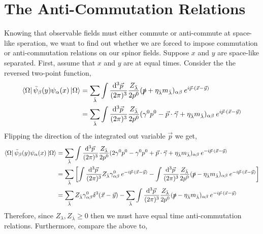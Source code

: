 \documentclass[12pt]{article}
\begin{document}
\section{The Anti-Commutation Relations}
Knowing that observable fields must either commute or anti-commute at space-like speration, we want to find out whether we are forced to impose commutation or anti-commutation relations on our spinor fields. Suppose $x$ and $y$ are space-like separated. First, assume that $x$ and $y$ are at equal times. Consider the the reversed two-point function,
\begin{align*}
\left< \Omega \right| \bar{\psi}_{\beta}(y) \psi_{\alpha}(x) \left| \Omega \right> & = \sum_{\bar{\lambda}} \int \frac{\mathrm{d}^{3} \vec{p} \:}{(2 \pi)^3} \frac{Z_{{\bar{\lambda}}}}{2 p^0} (\slashed{p} + \eta_{\bar{\lambda}} m_{\bar{\lambda}})_{\alpha \beta} \: e^{i \vec{p} \cdot (\vec{x} - \vec{y}) }
\\
& = \sum_{\bar{\lambda}} \int \frac{\mathrm{d}^{3} \vec{p} \:}{(2 \pi)^3} \frac{Z_{{\bar{\lambda}}}}{2 p^0} (\gamma^0 p^0 - \vec{p} \cdot \vec{\gamma} + \eta_{\bar{\lambda}} m_{\bar{\lambda}})_{\alpha \beta} \: e^{i \vec{p} \cdot (\vec{x} - \vec{y})}
\end{align*}
Flipping the direction of the integrated out variable $\vec{p}$ we get,
\begin{align*}
\left< \Omega \right| \bar{\psi}_{\beta}(y) \psi_{\alpha}(x) \left| \Omega \right> 
& = \sum_{\bar{\lambda}} \int \frac{\mathrm{d}^{3} \vec{p} \:}{(2 \pi)^3} \frac{Z_{{\bar{\lambda}}}}{2 p^0} (2 \gamma^0 p^0 - \gamma^0 p^0 + \vec{p} \cdot \vec{\gamma} + \eta_{\bar{\lambda}} m_{\bar{\lambda}})_{\alpha \beta} \: e^{- i \vec{p} \cdot (\vec{x} - \vec{y})}
\\
& = \sum_{\bar{\lambda}} \left[ \int \frac{\mathrm{d}^{3} \vec{p} \:}{(2 \pi)^3} Z_{\bar{\lambda}} \gamma^0_{\alpha \beta} \: e^{- i \vec{p} \cdot (\vec{x} - \vec{y})} - \int \frac{\mathrm{d}^{3} \vec{p} \:}{(2 \pi)^3} \frac{Z_{{\bar{\lambda}}}}{2 p^0} (\slashed{p} - \eta_{\bar{\lambda}} m_{\bar{\lambda}})_{\alpha \beta} \: e^{- i \vec{p} \cdot (\vec{x} - \vec{y})} \right]
\\
& = \sum_{\bar{\lambda}} Z_{\bar{\lambda}} \gamma^0_{\alpha \beta} \delta^3(\vec{x} - \vec{y}) - \sum_{\bar{\lambda}} \int \frac{\mathrm{d}^{3} \vec{p} \:}{(2 \pi)^3} \frac{Z_{{\bar{\lambda}}}}{2 p^0} (\slashed{p} - \eta_{\bar{\lambda}} m_{\bar{\lambda}})_{\alpha \beta} \: e^{- i \vec{p} \cdot (\vec{x} - \vec{y})}
\end{align*}
Therefore, since $Z_\lambda, Z_{\bar{\lambda}} \ge 0$ then we must have equal time anti-commutation relations. 
Furthermore, compare the above to, 
\end{document}
